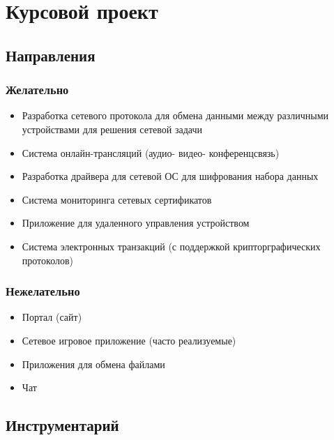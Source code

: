 





\section{Курсовой проект}

\subsection{Направления}

\subsubsection{Желательно}

\begin{itemize}
    \item Разработка сетевого протокола для обмена данными между различными устройствами для решения сетевой задачи
    \item Система онлайн-трансляций (аудио- видео- конференцсвязь)
    \item Разработка драйвера для сетевой ОС для шифрования набора данных
    \item Система мониторинга сетевых сертификатов
    \item Приложение для удаленного управления устройством
    \item Система электронных транзакций (с поддержкой крипторграфических протоколов)
\end{itemize}

\subsubsection{Нежелательно}

\begin{itemize}
    \item Портал (сайт)
    \item Сетевое игровое приложение (часто реализуемые)
    \item Приложения для обмена файлами
    \item Чат
\end{itemize}

\subsection{Инструментарий}

